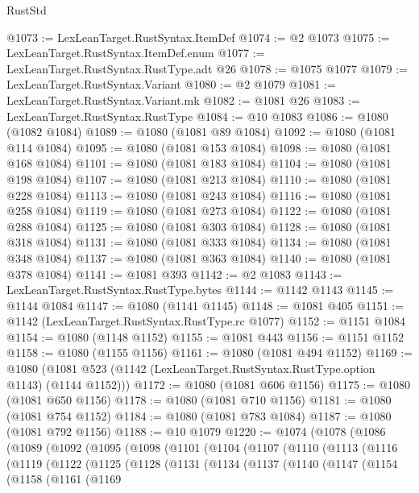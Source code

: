 \begin{lexlean}{RustStd}
\begin{coremodule}
@1073 := LexLeanTarget.RustSyntax.ItemDef
@1074 := @2 @1073
@1075 := LexLeanTarget.RustSyntax.ItemDef.enum
@1077 := LexLeanTarget.RustSyntax.RustType.adt @26
@1078 := @1075 @1077
@1079 := LexLeanTarget.RustSyntax.Variant
@1080 := @2 @1079
@1081 := LexLeanTarget.RustSyntax.Variant.mk
@1082 := @1081 @26
@1083 := LexLeanTarget.RustSyntax.RustType
@1084 := @10 @1083
@1086 := @1080 (@1082 @1084)
@1089 := @1080 (@1081 @89 @1084)
@1092 := @1080 (@1081 @114 @1084)
@1095 := @1080 (@1081 @153 @1084)
@1098 := @1080 (@1081 @168 @1084)
@1101 := @1080 (@1081 @183 @1084)
@1104 := @1080 (@1081 @198 @1084)
@1107 := @1080 (@1081 @213 @1084)
@1110 := @1080 (@1081 @228 @1084)
@1113 := @1080 (@1081 @243 @1084)
@1116 := @1080 (@1081 @258 @1084)
@1119 := @1080 (@1081 @273 @1084)
@1122 := @1080 (@1081 @288 @1084)
@1125 := @1080 (@1081 @303 @1084)
@1128 := @1080 (@1081 @318 @1084)
@1131 := @1080 (@1081 @333 @1084)
@1134 := @1080 (@1081 @348 @1084)
@1137 := @1080 (@1081 @363 @1084)
@1140 := @1080 (@1081 @378 @1084)
@1141 := @1081 @393
@1142 := @2 @1083
@1143 := LexLeanTarget.RustSyntax.RustType.bytes
@1144 := @1142 @1143
@1145 := @1144 @1084
@1147 := @1080 (@1141 @1145)
@1148 := @1081 @405
@1151 := @1142 (LexLeanTarget.RustSyntax.RustType.rc @1077)
@1152 := @1151 @1084
@1154 := @1080 (@1148 @1152)
@1155 := @1081 @443
@1156 := @1151 @1152
@1158 := @1080 (@1155 @1156)
@1161 := @1080 (@1081 @494 @1152)
@1169 := @1080 (@1081 @523 (@1142 (LexLeanTarget.RustSyntax.RustType.option @1143) (@1144 @1152)))
@1172 := @1080 (@1081 @606 @1156)
@1175 := @1080 (@1081 @650 @1156)
@1178 := @1080 (@1081 @710 @1156)
@1181 := @1080 (@1081 @754 @1152)
@1184 := @1080 (@1081 @783 @1084)
@1187 := @1080 (@1081 @792 @1156)
@1188 := @10 @1079
@1220 := @1074
    (@1078
      (@1086
        (@1089
          (@1092
            (@1095
              (@1098
                (@1101
                  (@1104
                    (@1107
                      (@1110
                        (@1113
                          (@1116
                            (@1119
                              (@1122
                                (@1125
                                  (@1128
                                    (@1131
                                      (@1134
                                        (@1137
                                          (@1140
                                            (@1147
                                              (@1154
                                                (@1158
                                                  (@1161
                                                    (@1169

\end{coremodule}
\end{lexlean}

